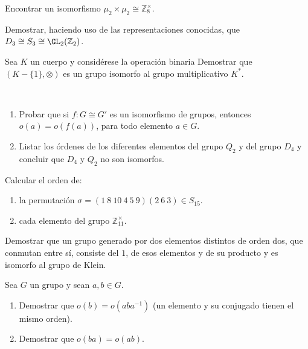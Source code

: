 \begin{ejercicio}\label{ej:2.27}
    Encontrar un isomorfismo $\mu_2 \times \mu_2 \cong \mathbb{Z}^{\times}_8$.
\end{ejercicio}

\begin{ejercicio}\label{ej:2.28}
    Demostrar, haciendo uso de las representaciones conocidas, que $D_3 \cong S_3 \cong \GL_2(\mathbb{Z}_2)$.
\end{ejercicio}

\begin{ejercicio}\label{ej:2.29}
    Sea $K$ un cuerpo y considérese la operación binaria
    Demostrar que $(K - \{1\}, \otimes)$ es un grupo isomorfo al grupo multiplicativo $K^{\ast}$.
\end{ejercicio}

\begin{ejercicio}\label{ej:2.30}~
    \begin{enumerate}
        \item Probar que si $f : G \cong G'$ es un isomorfismo de grupos, entonces $o(a) = o(f(a))$, para todo elemento $a \in G$.
        \item Listar los órdenes de los diferentes elementos del grupo $Q_2$ y del grupo $D_4$ y concluir que $D_4$ y $Q_2$ no son isomorfos.
    \end{enumerate}
\end{ejercicio}

\begin{ejercicio}\label{ej:2.31}
    Calcular el orden de:
    \begin{enumerate}
        \item la permutación $\sigma = (1\ 8\ 10\ 4\ 5\ 9)(2\ 6\ 3) \in S_{15}$.
        \item cada elemento del grupo $\mathbb{Z}^{\times}_{11}$.
    \end{enumerate}
\end{ejercicio}

\begin{ejercicio}\label{ej:2.32}
    Demostrar que un grupo generado por dos elementos distintos de orden dos, que conmutan entre sí, consiste del $1$, de esos elementos y de su producto y es isomorfo al grupo de Klein.
\end{ejercicio}

\begin{ejercicio}\label{ej:2.33}
    Sea $G$ un grupo y sean $a, b \in G$.
    \begin{enumerate}
        \item Demostrar que $o(b) = o(aba^{-1})$ (un elemento y su conjugado tienen el mismo orden).
        \item Demostrar que $o(ba) = o(ab)$.
    \end{enumerate}
\end{ejercicio}

